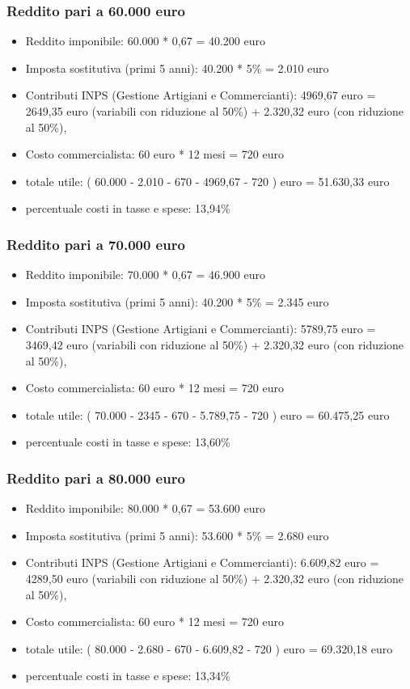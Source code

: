 \documentclass{article}
\begin{document}
\subsubsection{Reddito pari a 60.000 euro}
\begin{itemize}
    \item Reddito imponibile: 60.000 * 0,67 = 40.200 euro
    \item Imposta sostitutiva (primi 5 anni): 40.200 * 5\% = 2.010 euro
    \item Contributi INPS (Gestione Artigiani e Commercianti): 4969,67 euro = 2649,35 euro (variabili con riduzione al 50\%) + 2.320,32 euro (con riduzione al 50\%),
    \item Costo commercialista: 60 euro * 12 mesi = 720 euro
    \item totale utile: ( 60.000 - 2.010 - 670 - 4969,67 - 720 ) euro = 51.630,33 euro
    \item percentuale costi in tasse e spese: 13,94\%
\end{itemize}

\subsubsection{Reddito pari a 70.000 euro}
\begin{itemize}
    \item Reddito imponibile: 70.000 * 0,67 = 46.900 euro
    \item Imposta sostitutiva (primi 5 anni): 40.200 * 5\% = 2.345 euro
    \item Contributi INPS (Gestione Artigiani e Commercianti): 5789,75 euro = 3469,42 euro (variabili con riduzione al 50\%) + 2.320,32 euro (con riduzione al 50\%),
    \item Costo commercialista: 60 euro * 12 mesi = 720 euro
    \item totale utile: ( 70.000 - 2345 - 670 - 5.789,75 - 720 ) euro = 60.475,25 euro
    \item percentuale costi in tasse e spese: 13,60\%
\end{itemize}

\subsubsection{Reddito pari a 80.000 euro}
\begin{itemize}
    \item Reddito imponibile: 80.000 * 0,67 = 53.600 euro
    \item Imposta sostitutiva (primi 5 anni): 53.600 * 5\% = 2.680 euro
    \item Contributi INPS (Gestione Artigiani e Commercianti): 6.609,82 euro = 4289,50 euro (variabili con riduzione al 50\%) + 2.320,32 euro (con riduzione al 50\%),
    \item Costo commercialista: 60 euro * 12 mesi = 720 euro
    \item totale utile: ( 80.000 - 2.680 - 670 - 6.609,82 - 720 ) euro = 69.320,18 euro
    \item percentuale costi in tasse e spese: 13,34\%
\end{itemize}
\end{document}
